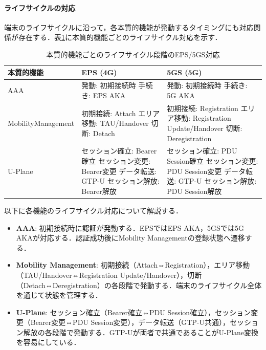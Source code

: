 \paragraph{ライフサイクルの対応}

端末のライフサイクルに沿って，各本質的機能が発動するタイミングにも対応関係が存在する．表\ref{tab:lifecycle_mapping}に本質的機能ごとのライフサイクル対応を示す．

\begin{table}[htbp]
\centering
\caption{本質的機能ごとのライフサイクル段階のEPS/5GS対応}
\label{tab:lifecycle_mapping}
\begin{tabular}{|p{3cm}|p{5.5cm}|p{5.5cm}|}
\hline
\textbf{本質的機能} & \textbf{EPS (4G)} & \textbf{5GS (5G)} \\
\hline
AAA &
発動: 初期接続時\newline
手続き: EPS AKA &
発動: 初期接続時\newline
手続き: 5G AKA \\
\hline
Mobility\newline Management &
初期接続: Attach\newline
エリア移動: TAU/Handover\newline
切断: Detach &
初期接続: Registration\newline
エリア移動: Registration Update/Handover\newline
切断: Deregistration \\
\hline
U-Plane &
セッション確立: Bearer確立\newline
セッション変更: Bearer変更\newline
データ転送: GTP-U\newline
セッション解放: Bearer解放 &
セッション確立: PDU Session確立\newline
セッション変更: PDU Session変更\newline
データ転送: GTP-U\newline
セッション解放: PDU Session解放 \\
\hline
\end{tabular}
\end{table}

以下に各機能のライフサイクル対応について解説する．

\begin{itemize}
  \item \textbf{AAA}: 初期接続時に認証が発動する．EPSではEPS AKA，5GSでは5G AKAが対応する．認証成功後にMobility Managementの登録状態へ遷移する．
  \item \textbf{Mobility Management}: 初期接続（Attach⇔Registration），エリア移動（TAU/Handover⇔Registration Update/Handover），切断（Detach⇔Deregistration）の各段階で発動する．端末のライフサイクル全体を通じて状態を管理する．
  \item \textbf{U-Plane}: セッション確立（Bearer確立⇔PDU Session確立），セッション変更（Bearer変更⇔PDU Session変更），データ転送（GTP-U共通），セッション解放の各段階で発動する．GTP-Uが両者で共通であることがU-Plane変換を容易にしている．
\end{itemize}

